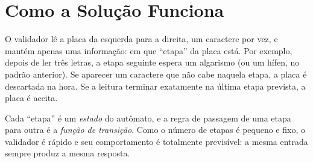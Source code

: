 \section{Como a Solução Funciona}
\label{sec:como-funciona}

O validador lê a placa da esquerda para a direita, um caractere
por vez, e mantém apenas uma informação: em que ``etapa'' da placa
está. Por exemplo, depois de ler três letras, a etapa seguinte
espera um algarismo (ou um hífen, no padrão anterior). Se aparecer
um caractere que não cabe naquela etapa, a placa é descartada na
hora. Se a leitura terminar exatamente na última etapa prevista, a
placa é aceita.

Cada ``etapa'' é um \emph{estado} do autômato, e a regra de passagem
de uma etapa para outra é a \emph{função de transição}. Como o
número de etapas é pequeno e fixo, o validador é rápido e seu
comportamento é totalmente previsível: a mesma entrada sempre
produz a mesma resposta.